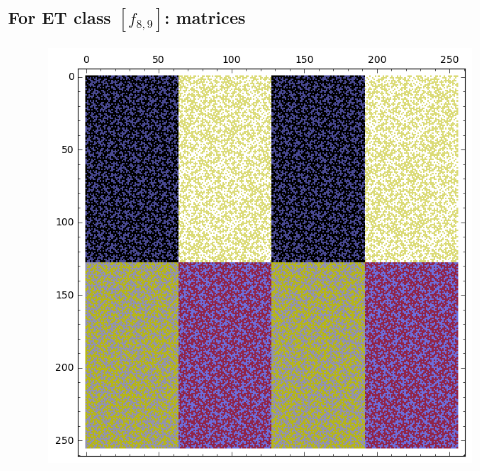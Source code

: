 \documentclass[pdf,sprung,slideColor,nocolorBG]{beamer}
\newenvironment{colortheme}[1]{
\def\ProvidesPackageRCS $##1${\relax}
\renewcommand{\ProcessOptions}{\relax}
\makeatletter

\makeatother
}{}
\begin{document}
\begin{colortheme}{jubata}
\begin{frame}
\frametitle{For ET class $[f_{8,9}]$: matrices}
\begin{figure}
\centering
\begin{minipage}{.48\textwidth}
  \centering
  \includegraphics[width=.9\linewidth]{../matrix_plot/re8_9_bent_cayley_graph_index_matrix.png}
  \label{fig:c8_9_bent_cayley_graph_index_matrix}
\end{minipage}

\end{figure}
\end{frame}
\end{colortheme}
\end{document}
